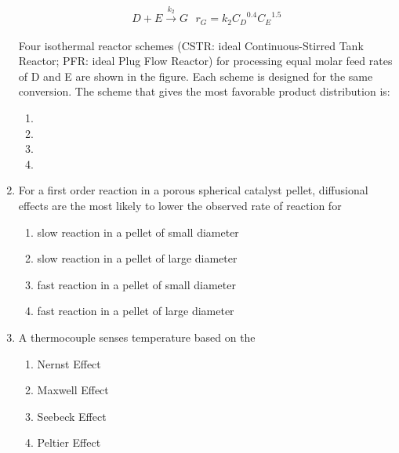 \documentclass[journal]{IEEEtran}
\begin{document}
\begin{enumerate}
        \begin{align*}
            D + E \overset{k_2}{\to} G \hspace{8pt} r_G = k_2 {C_D}^{0.4} {C_E}^{1.5}
        \end{align*}
        
Four isothermal reactor schemes (CSTR: ideal Continuous-Stirred Tank Reactor; PFR: ideal Plug Flow Reactor) for processing equal molar feed rates of D and E are shown in the figure. Each scheme is designed for the same conversion. The scheme that gives the most favorable product distribution is:

    \begin{multicols}{2}
    \begin{enumerate}
        \item 
        \item 
        \item 
        \item 
    \end{enumerate}
    \end{multicols}

    \item For a first order reaction in a porous spherical catalyst pellet, diffusional effects are the most likely to lower the observed rate of reaction for

\begin{enumerate}
    \item slow reaction in a pellet of small diameter
    \item slow reaction in a pellet of large diameter
    \item fast reaction in a pellet of small diameter
    \item fast reaction in a pellet of large diameter
\end{enumerate}
\bigskip
    \item A thermocouple senses temperature based on the 

\begin{multicols}{4}
    \begin{enumerate}
        \item Nernst Effect
        \item Maxwell Effect
        \item Seebeck Effect
        \item Peltier Effect
    \end{enumerate}
\end{multicols}


\end{enumerate}
\end{document}
